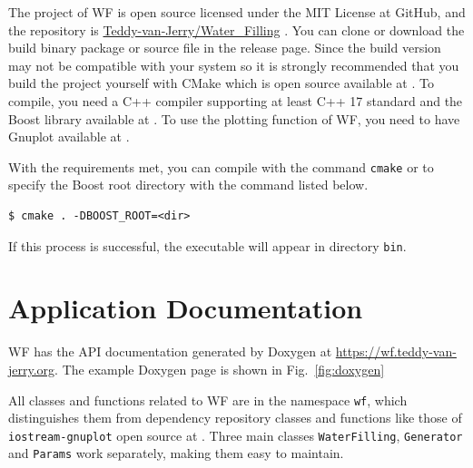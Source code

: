 \documentclass[journal,twoside]{IEEEtran}
\begin{document}
    The project of WF is open source licensed under the MIT License at GitHub,
    and the repository is \href{https://github.com/Teddy-van-Jerry/Water_Filling}{Teddy-van-Jerry/Water\_Filling} \cite{web:WF}.
    You can clone or download the build binary package or source file in the release page.
    Since the build version may not be compatible with your system so it is strongly recommended that you build the project yourself with CMake which is open source available at \cite{web:cmake}.
    To compile, you need a C++ compiler supporting at least C++ 17 standard \cite{isocpp} and the Boost library available at \cite{web:boost}.
    To use the plotting function of WF, you need to have Gnuplot available at \cite{web:gnuplot}.

    With the requirements met, you can compile with the command \texttt{cmake} or to specify the Boost root directory with the command listed below.
    \begin{lstlisting}[morekeywords={\$}]
$ cmake . -DBOOST_ROOT=<dir>
    \end{lstlisting}
    If this process is successful, the executable will appear in directory \texttt{bin}.





  \section{Application Documentation}\label{sec:doc}

    WF has the API documentation generated by Doxygen at \url{https://wf.teddy-van-jerry.org}.
    The example Doxygen page is shown in Fig.~\ref{fig:doxygen}

    All classes and functions related to WF are in the namespace \texttt{wf}, which distinguishes them from dependency repository classes and functions like those of \texttt{iostream-gnuplot} open source at \cite{web:gnuplot-iostream}.
    Three main classes \texttt{WaterFilling}, \texttt{Generator} and
    \texttt{Params} work separately, making them easy to maintain.
    
\end{document}
